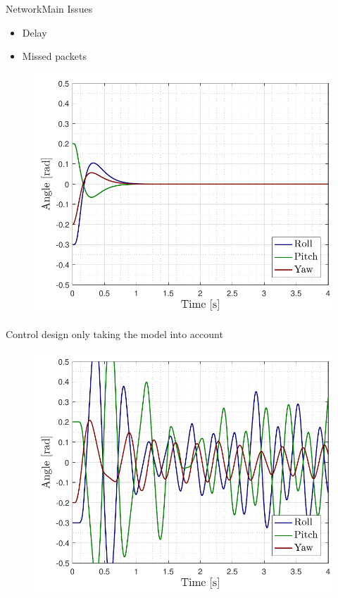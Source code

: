 \begin{frame}{Network}{Main Issues}
    \begin{itemize}
        \item Delay
    \end{itemize}
    \begin{itemize}
        \item Missed packets
    \end{itemize}
    
    \begin{minipage}{\linewidth}
        \begin{minipage}{0.49\linewidth}
            \begin{figure}[H]
                \includegraphics[width=1\textwidth]{figures/nonetwork}
            \end{figure}
            \centering
            Control design only taking the model into account
        \end{minipage}
        \hspace{0.03\linewidth}
        \begin{minipage}{0.49\linewidth}
            \begin{figure}[H]
                \includegraphics[width=1\textwidth]{figures/network}

\end{figure}
\end{minipage}
\end{minipage}
\end{frame}
